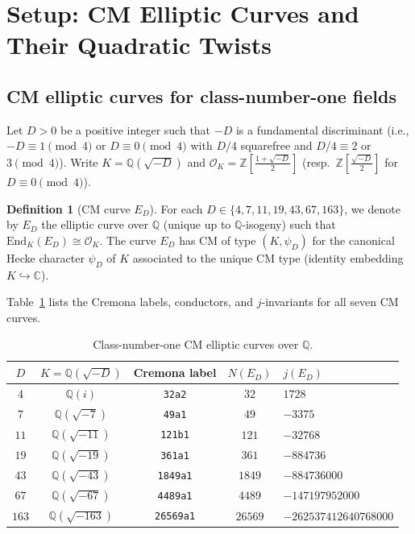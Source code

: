 \documentclass[12pt,a4paper]{article}
\theoremstyle{plain}
\theoremstyle{definition}
\newtheorem{definition}[theorem]{Definition}
\newcommand{\Q}{\mathbb{Q}}
\newcommand{\Z}{\mathbb{Z}}
\newcommand{\C}{\mathbb{C}}
\newcommand{\OK}{\mathcal{O}_K}
\newcommand{\End}{\mathrm{End}}
\begin{document}
\section{Setup: CM Elliptic Curves and Their Quadratic Twists}
\label{sec:setup}

\subsection{CM elliptic curves for class-number-one fields}

Let $D > 0$ be a positive integer such that $-D$ is a fundamental discriminant
(i.e., $-D \equiv 1 \pmod{4}$ or $D \equiv 0 \pmod{4}$ with $D/4$ squarefree
and $D/4 \equiv 2$ or $3 \pmod{4}$).
Write $K = \Q(\sqrt{-D})$ and $\OK = \Z[\frac{1+\sqrt{-D}}{2}]$ (resp.\
$\Z[\frac{\sqrt{-D}}{2}]$ for $D \equiv 0\pmod{4}$).

\begin{definition}[CM curve $E_D$]
\label{def:E_D}
For each $D \in \{4, 7, 11, 19, 43, 67, 163\}$, we denote by $E_D$ the
elliptic curve over $\Q$ (unique up to $\Q$-isogeny) such that
$\End_{K}(E_D) \cong \OK$.  The curve $E_D$ has CM of type $(K, \psi_D)$
for the canonical Hecke character $\psi_D$ of $K$ associated to the unique
CM type (identity embedding $K \hookrightarrow \C$).
\end{definition}

Table~\ref{tab:curves} lists the Cremona labels, conductors, and $j$-invariants
for all seven CM curves.

\begin{table}[h]
\centering
\caption{Class-number-one CM elliptic curves over $\Q$.}
\label{tab:curves}
\begin{tabular}{ccccl}
\toprule
$D$ & $K = \Q(\sqrt{-D})$ & Cremona label & $N(E_D)$ & $j(E_D)$ \\
\midrule
$4$   & $\Q(i)$              & \texttt{32a2}    & $32$    & $1728$ \\
$7$   & $\Q(\sqrt{-7})$      & \texttt{49a1}    & $49$    & $-3375$ \\
$11$  & $\Q(\sqrt{-11})$     & \texttt{121b1}   & $121$   & $-32768$ \\
$19$  & $\Q(\sqrt{-19})$     & \texttt{361a1}   & $361$   & $-884736$ \\
$43$  & $\Q(\sqrt{-43})$     & \texttt{1849a1}  & $1849$  & $-884736000$ \\
$67$  & $\Q(\sqrt{-67})$     & \texttt{4489a1}  & $4489$  & $-147197952000$ \\
$163$ & $\Q(\sqrt{-163})$    & \texttt{26569a1} & $26569$ & $-262537412640768000$ \\
\bottomrule
\end{tabular}
\end{table}
\end{document}
